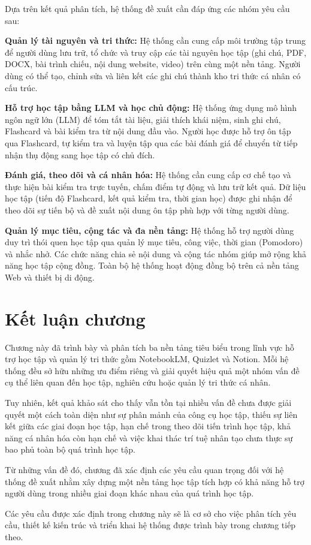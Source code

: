 Dựa trên kết quả phân tích, hệ thống đề xuất cần đáp ứng các nhóm yêu cầu sau:

\textbf{Quản lý tài nguyên và tri thức:} Hệ thống cần cung cấp môi trường tập trung để người dùng lưu trữ, tổ chức và truy cập các tài nguyên học tập (ghi chú, PDF, DOCX, bài trình chiếu, nội dung website, video) trên cùng một nền tảng. Người dùng có thể tạo, chỉnh sửa và liên kết các ghi chú thành kho tri thức cá nhân có cấu trúc.

\textbf{Hỗ trợ học tập bằng LLM và học chủ động:} Hệ thống ứng dụng mô hình ngôn ngữ lớn (LLM) để tóm tắt tài liệu, giải thích khái niệm, sinh ghi chú, Flashcard và bài kiểm tra từ nội dung đầu vào. Người học được hỗ trợ ôn tập qua Flashcard, tự kiểm tra và luyện tập qua các bài đánh giá để chuyển từ tiếp nhận thụ động sang học tập có chủ đích.

\textbf{Đánh giá, theo dõi và cá nhân hóa:} Hệ thống cần cung cấp cơ chế tạo và thực hiện bài kiểm tra trực tuyến, chấm điểm tự động và lưu trữ kết quả. Dữ liệu học tập (tiến độ Flashcard, kết quả kiểm tra, thời gian học) được ghi nhận để theo dõi sự tiến bộ và đề xuất nội dung ôn tập phù hợp với từng người dùng.

\textbf{Quản lý mục tiêu, cộng tác và đa nền tảng:} Hệ thống hỗ trợ người dùng duy trì thói quen học tập qua quản lý mục tiêu, công việc, thời gian (Pomodoro) và nhắc nhở. Các chức năng chia sẻ nội dung và cộng tác nhóm giúp mở rộng khả năng học tập cộng đồng. Toàn bộ hệ thống hoạt động đồng bộ trên cả nền tảng Web và thiết bị di động.

\section{Kết luận chương}

Chương này đã trình bày và phân tích ba nền tảng tiêu biểu trong lĩnh vực hỗ trợ học tập và quản lý tri thức gồm NotebookLM, Quizlet và Notion. Mỗi hệ thống đều sở hữu những ưu điểm riêng và giải quyết hiệu quả một nhóm vấn đề cụ thể liên quan đến học tập, nghiên cứu hoặc quản lý tri thức cá nhân.

Tuy nhiên, kết quả khảo sát cho thấy vẫn tồn tại nhiều vấn đề chưa được giải quyết một cách toàn diện như sự phân mảnh của công cụ học tập, thiếu sự liên kết giữa các giai đoạn học tập, hạn chế trong theo dõi tiến trình học tập, khả năng cá nhân hóa còn hạn chế và việc khai thác trí tuệ nhân tạo chưa thực sự bao phủ toàn bộ quá trình học tập.

Từ những vấn đề đó, chương đã xác định các yêu cầu quan trọng đối với hệ thống đề xuất nhằm xây dựng một nền tảng học tập tích hợp có khả năng hỗ trợ người dùng trong nhiều giai đoạn khác nhau của quá trình học tập.

Các yêu cầu được xác định trong chương này sẽ là cơ sở cho việc phân tích yêu cầu, thiết kế kiến trúc và triển khai hệ thống được trình bày trong chương tiếp theo.


